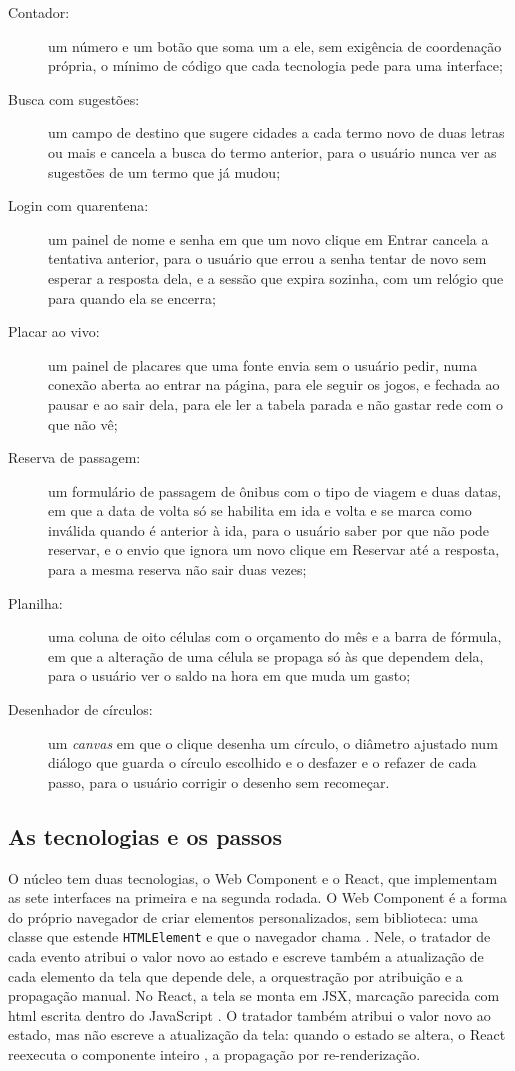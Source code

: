 \begin{description}
\item[{Contador:}] um número e um botão que soma um a ele, sem exigência de
coordenação própria, o mínimo de código que cada tecnologia pede para
uma interface;
\item[{Busca com sugestões:}] um campo de destino que sugere cidades a cada
termo novo de duas letras ou mais e cancela a busca do termo anterior,
para o usuário nunca ver as sugestões de um termo que já mudou;
\item[{Login com quarentena:}] um painel de nome e senha em que um novo
clique em Entrar cancela a tentativa anterior, para o usuário que errou
a senha tentar de novo sem esperar a resposta dela, e a sessão que
expira sozinha, com um relógio que para quando ela se encerra;
\item[{Placar ao vivo:}] um painel de placares que uma fonte envia sem o
usuário pedir, numa conexão aberta ao entrar na página, para ele seguir
os jogos, e fechada ao pausar e ao sair dela, para ele ler a tabela
parada e não gastar rede com o que não vê;
\item[{Reserva de passagem:}] um formulário de passagem de ônibus com o tipo
de viagem e duas datas, em que a data de volta só se habilita em ida e
volta e se marca como inválida quando é anterior à ida, para o usuário
saber por que não pode reservar, e o envio que ignora um novo clique
em Reservar até a resposta, para a mesma reserva não sair duas vezes;
\item[{Planilha:}] uma coluna de oito células com o orçamento do mês e a
barra de fórmula, em que a alteração de uma célula se propaga só às
que dependem dela, para o usuário ver o saldo na hora em que muda um
gasto;
\item[{Desenhador de círculos:}] um \emph{canvas} em que o clique desenha um
círculo, o diâmetro ajustado num diálogo que guarda o círculo escolhido
e o desfazer e o refazer de cada passo, para o usuário corrigir o
desenho sem recomeçar.
\end{description}
\subsection{As tecnologias e os passos}
\label{sec:as-tecnologias-e-os-passos}

O núcleo tem duas tecnologias, o Web Component e o React, que
implementam as sete interfaces na primeira e na segunda rodada.
O Web Component é a forma do próprio navegador de criar elementos
personalizados, sem biblioteca: uma classe que estende \texttt{HTMLElement} e
que o navegador chama \cite{mozilla2026}.
Nele, o tratador de cada evento atribui o valor novo ao estado e escreve
também a atualização de cada elemento da tela que depende dele, a
orquestração por atribuição e a propagação manual.
No React, a tela se monta em JSX, marcação parecida com \gls{html}
escrita dentro do JavaScript \cite{meta2026c}.
O tratador também atribui o valor novo ao estado, mas não escreve a
atualização da tela: quando o estado se altera, o React reexecuta o
componente inteiro \cites[][ p. 289:38]{lee2025}{solidjs2026}, a
propagação por re-renderização.

